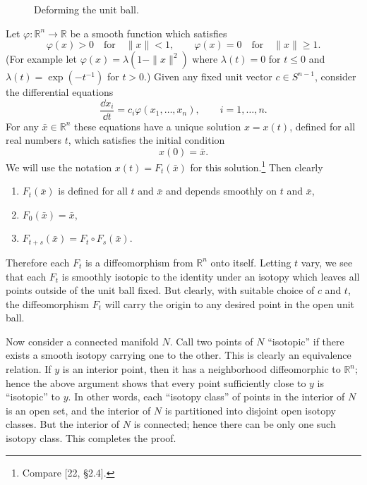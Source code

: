 \begin{figure}[htbp]
\centering
\setcounter{figure}{6}%
\caption{Deforming the unit ball.}\label{fig:milnor-07}
\end{figure}

Let $\varphi : \mathbb{R}^n \to \mathbb{R}$ be a smooth function which satisfies
\[
\varphi(x) > 0 \quad \text{for} \quad \|x\| < 1, \qquad \varphi(x) = 0 \quad \text{for} \quad \|x\| \geq 1.
\]
(For example let $\varphi(x) = \lambda(1 - \|x\|^2)$ where $\lambda(t) = 0$ for $t \leq 0$ and $\lambda(t) = \exp(-t^{-1})$ for $t > 0$.) Given any fixed unit vector $c \in S^{n-1}$, consider the differential equations
\[
\frac{\dd x_i}{\dd t} = c_i \varphi(x_1, \ldots, x_n), \qquad i = 1, \ldots, n.
\]
For any $\bar{x} \in \mathbb{R}^n$ these equations have a unique solution $x = x(t)$, defined for all real numbers $t$, which satisfies the initial condition
\[
x(0) = \bar{x}.
\]
We will use the notation $x(t) = F_t(\bar{x})$ for this solution.\footnote{Compare [22, §2.4].} Then clearly
\begin{enumerate}
\item $F_t(\bar{x})$ is defined for all $t$ and $\bar{x}$ and depends smoothly on $t$ and $\bar{x}$,
\item $F_0(\bar{x}) = \bar{x}$,
\item $F_{t+s}(\bar{x}) = F_t \circ F_s(\bar{x})$.
\end{enumerate}



Therefore each $F_t$ is a diffeomorphism from $\mathbb{R}^n$ onto itself. Letting $t$ vary, we see that each $F_t$ is smoothly isotopic to the identity under an isotopy which leaves all points outside of the unit ball fixed. But clearly, with suitable choice of $c$ and $t$, the diffeomorphism $F_t$ will carry the origin to any desired point in the open unit ball.

Now consider a connected manifold $N$. Call two points of $N$ ``isotopic'' if there exists a smooth isotopy carrying one to the other. This is clearly an equivalence relation. If $y$ is an interior point, then it has a neighborhood diffeomorphic to $\mathbb{R}^n$; hence the above argument shows that every point sufficiently close to $y$ is ``isotopic'' to $y$. In other words, each ``isotopy class'' of points in the interior of $N$ is an open set, and the interior of $N$ is partitioned into disjoint open isotopy classes. But the interior of $N$ is connected; hence there can be only one such isotopy class. This completes the proof.

